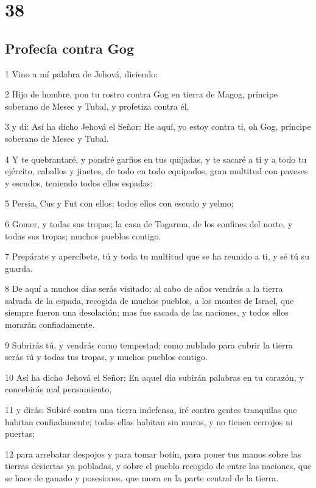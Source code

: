 \chapter{38}

\section*{Profecía contra Gog}

\par 1 Vino a mí palabra de Jehová, diciendo:
\par 2 Hijo de hombre, pon tu rostro contra Gog en tierra de Magog, príncipe soberano de Mesec y Tubal, y profetiza contra él,
\par 3 y di: Así ha dicho Jehová el Señor: He aquí, yo estoy contra ti, oh Gog, príncipe soberano de Mesec y Tubal.
\par 4 Y te quebrantaré, y pondré garfios en tus quijadas, y te sacaré a ti y a todo tu ejército, caballos y jinetes, de todo en todo equipados, gran multitud con paveses y escudos, teniendo todos ellos espadas;
\par 5 Persia, Cus y Fut con ellos; todos ellos con escudo y yelmo;
\par 6 Gomer, y todas sus tropas; la casa de Togarma, de los confines del norte, y todas sus tropas; muchos pueblos contigo.
\par 7 Prepárate y apercíbete, tú y toda tu multitud que se ha reunido a ti, y sé tú su guarda.
\par 8 De aquí a muchos días serás visitado; al cabo de años vendrás a la tierra salvada de la espada, recogida de muchos pueblos, a los montes de Israel, que siempre fueron una desolación; mas fue sacada de las naciones, y todos ellos morarán confiadamente.
\par 9 Subrirás tú, y vendrás como tempestad; como nublado para cubrir la tierra serás tú y todas tus tropas, y muchos pueblos contigo.
\par 10 Así ha dicho Jehová el Señor: En aquel día subirán palabras en tu corazón, y concebirás mal pensamiento,
\par 11 y dirás: Subiré contra una tierra indefensa, iré contra gentes tranquilas que habitan confiadamente; todas ellas habitan sin muros, y no tienen cerrojos ni puertas;
\par 12 para arrebatar despojos y para tomar botín, para poner tus manos sobre las tierras desiertas ya pobladas, y sobre el pueblo recogido de entre las naciones, que se hace de ganado y posesiones, que mora en la parte central de la tierra.
